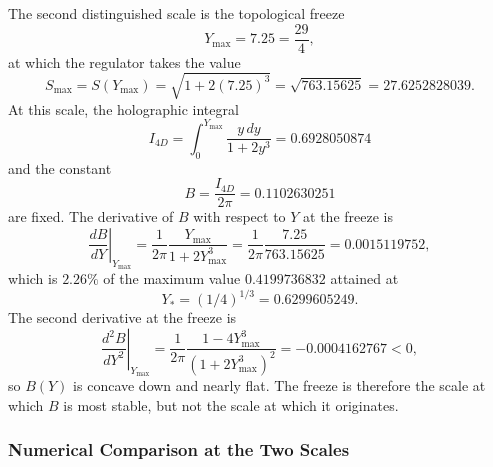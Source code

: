 \documentclass[12pt,oneside,openany]{book}
\begin{document}
The second distinguished scale is the topological freeze
\begin{equation}
Y_{\max} = 7.25 = \frac{29}{4},
\label{eq:Ymax-lock}
\end{equation}
at which the regulator takes the value
\begin{equation}
S_{\max} = S(Y_{\max}) = \sqrt{1 + 2(7.25)^3} = \sqrt{763.15625} = 27.6252828039.
\label{eq:Smax-lock}
\end{equation}
At this scale, the holographic integral
\begin{equation}
I_{4D} = \int_0^{Y_{\max}} \frac{y\,dy}{1 + 2y^3} = 0.6928050874
\label{eq:I4D-lock}
\end{equation}
and the constant
\begin{equation}
B = \frac{I_{4D}}{2\pi} = 0.1102630251
\label{eq:B-lock}
\end{equation}
are fixed. The derivative of $B$ with respect to $Y$ at the freeze is
\begin{equation}
\left.\frac{dB}{dY}\right|_{Y_{\max}} = \frac{1}{2\pi}\frac{Y_{\max}}{1 + 2Y_{\max}^3} = \frac{1}{2\pi}\frac{7.25}{763.15625} = 0.0015119752,
\label{eq:dBdY-lock}
\end{equation}
which is $2.26\%$ of the maximum value $0.4199736832$ attained at
\begin{equation}
Y_* = (1/4)^{1/3} = 0.6299605249.
\label{eq:Ystar}
\end{equation}
The second derivative at the freeze is
\begin{equation}
\left.\frac{d^2B}{dY^2}\right|_{Y_{\max}} = \frac{1}{2\pi}\frac{1 - 4Y_{\max}^3}{(1 + 2Y_{\max}^3)^2} = -0.0004162767 < 0,
\label{eq:d2BdY2-lock}
\end{equation}
so $B(Y)$ is concave down and nearly flat. The freeze is therefore the scale at which $B$ is most stable, but not the scale at which it originates.

\subsubsection{Numerical Comparison at the Two Scales}
\end{document}
